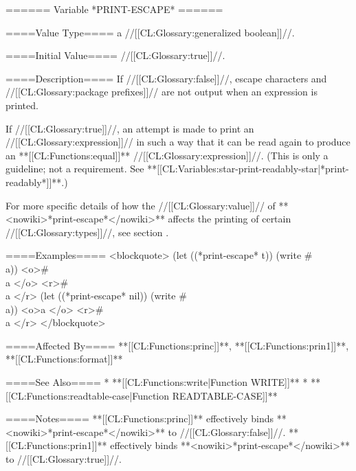====== Variable *PRINT-ESCAPE* ======

====Value Type====
a //[[CL:Glossary:generalized boolean]]//.

====Initial Value====
//[[CL:Glossary:true]]//.

====Description====
If //[[CL:Glossary:false]]//, escape characters and //[[CL:Glossary:package prefixes]]// are not output when an expression is printed.

If //[[CL:Glossary:true]]//, an attempt is made to print an //[[CL:Glossary:expression]]// in such a way that it can be read again to produce an **[[CL:Functions:equal]]** //[[CL:Glossary:expression]]//. (This is only a guideline; not a requirement. See **[[CL:Variables:star-print-readably-star|*print-readably*]]**.)

For more specific details of how the //[[CL:Glossary:value]]// of **<nowiki>*print-escape*</nowiki>** affects the printing of certain //[[CL:Glossary:types]]//, see section {\secref\DefaultPrintObjMeths}.

====Examples==== 
<blockquote> 
(let ((*print-escape* t)) 
  (write #\\a))
<o>#\\a </o>
<r>#\\a </r>
(let ((*print-escape* nil)) 
  (write #\\a))
<o>a </o>
<r>#\\a </r>
</blockquote>

====Affected By====
**[[CL:Functions:princ]]**, **[[CL:Functions:prin1]]**, **[[CL:Functions:format]]**

====See Also====
  * **[[CL:Functions:write|Function WRITE]]**
  * **[[CL:Functions:readtable-case|Function READTABLE-CASE]]**

====Notes====
**[[CL:Functions:princ]]** effectively binds **<nowiki>*print-escape*</nowiki>** to //[[CL:Glossary:false]]//. **[[CL:Functions:prin1]]** effectively binds **<nowiki>*print-escape*</nowiki>** to //[[CL:Glossary:true]]//.


